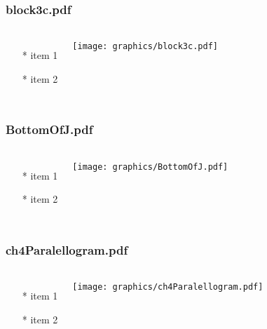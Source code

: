 \begin{frame} \frametitle{block3c.pdf}
    \begin{columns}[c]
        \begin{itemize}
            \item[*] item 1
            \item[*] item 2
        \end{itemize}
        \begin{minipage}{\linewidth}
            \begin{center}
            \texttt{[image: graphics/block3c.pdf]}
            \label{gfx:block3c.pdf}
            \end{center}
        \end{minipage}
    \end{columns}
\end{frame}
\begin{frame} \frametitle{BottomOfJ.pdf}
    \begin{columns}[c]
        \begin{itemize}
            \item[*] item 1
            \item[*] item 2
        \end{itemize}
        \begin{minipage}{\linewidth}
            \begin{center}
            \texttt{[image: graphics/BottomOfJ.pdf]}
            \label{gfx:BottomOfJ.pdf}
            \end{center}
        \end{minipage}
    \end{columns}
\end{frame}
\begin{frame} \frametitle{ch4Paralellogram.pdf}
    \begin{columns}[c]
        \begin{itemize}
            \item[*] item 1
            \item[*] item 2
        \end{itemize}
        \begin{minipage}{\linewidth}
            \begin{center}
            \texttt{[image: graphics/ch4Paralellogram.pdf]}
            \label{gfx:ch4Paralellogram.pdf}
            \end{center}
        \end{minipage}
    \end{columns}
\end{frame}
